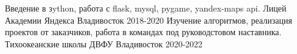 

\begin{cventries}

  \cventry
    {Введение в зython, работа с flask, mysql, pygame, yandex-maps api.} %
    {Лицей Академии Яндекса} %
    {Владивосток} %
    {2018-2020} %
    {}
    \cventry
    {Изучение алгоритмов, реализация проектов от заказчиков, работа в командах под руководстовом наставника.} %
    {Тихоокеанские школы ДВФУ} %
    {Владивосток} %
    {2020-2022} %
    {}

\end{cventries}




